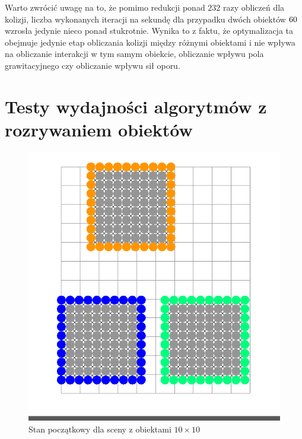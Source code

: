 \documentclass[12pt, letterpaper]{report}
\begin{document}
    Warto zwrócić uwagę na to, że pomimo redukcji ponad $232$ razy obliczeń dla kolizji, 
    liczba wykonanych iteracji na sekundę dla przypadku dwóch obiektów $60 \time 60$ wzrosła jedynie
    nieco ponad stukrotnie. Wynika to z faktu, że optymalizacja ta obejmuje jedynie etap obliczania
    kolizji między różnymi obiektami i nie wpływa na obliczanie interakcji w tym samym obiekcie,
    obliczanie wpływu pola grawitacyjnego czy obliczanie wpływu sił oporu.
    
    \clearpage
    \section{Testy wydajności algorytmów z rozrywaniem obiektów}
    \begin{figure}
        \includegraphics[width=0.9\linewidth]{app_boundary_performance_10x10_01.png} 
        \caption{Stan początkowy dla sceny z obiektami $10\times10$}

\end{figure}
\end{document}
